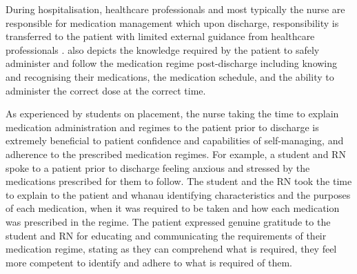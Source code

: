 \documentclass[british,12pt,a4paper]{article}
\begin{document}
	During hospitalisation, healthcare professionals and most typically the nurse are responsible for medication management which upon discharge, responsibility is transferred to the patient with limited external guidance from healthcare professionals \parencite{Mortelmans2021}. \textcite{Mortelmans2021} also depicts the knowledge required by the patient to safely administer and follow the medication regime post-discharge including knowing and recognising their medications, the medication schedule, and the ability to administer the correct dose at the correct time. 

	As experienced by students on placement, the nurse taking the time to explain medication administration and regimes to the patient prior to discharge is extremely beneficial to patient confidence and capabilities of self-managing, and adherence to the prescribed medication regimes. For example, a student and RN spoke to a patient prior to discharge feeling anxious and stressed by the medications prescribed for them to follow. The student and the RN took the time to explain to the patient and whanau identifying characteristics and the purposes of each medication, when it was required to be taken and how each medication was prescribed in the regime. The patient expressed genuine gratitude to the student and RN for educating and communicating the requirements of their medication regime, stating as they can comprehend what is required, they feel more competent to identify and adhere to what is required of them. 
\end{document}
